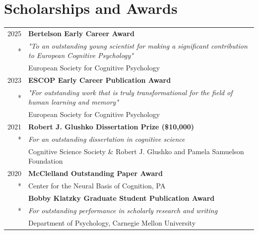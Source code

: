 \documentclass[letterpaper]{article}
\begin{document}
\section*{Scholarships and Awards}
\begin{longtable}{rl}
  2025        & \textbf{Bertelson Early Career Award}                                                                            \\*
  & {\it "To an outstanding young scientist for making a significant contribution to European Cognitive Psychology"} \\
              & European Society for Cognitive Psychology                                                                        \\[6pt]
              2023        & \textbf{ESCOP Early Career Publication Award}                                                                    \\*
              & {\it "For outstanding work that is truly transformational for the field of human learning and memory"}           \\
              & European Society for Cognitive Psychology                                                                        \\[6pt]
              2021        & \textbf{Robert J. Glushko Dissertation Prize (\$10,000)}                                                         \\*
              & {\it For an outstanding dissertation in cognitive science}                                                       \\
              & Cognitive Science Society \& Robert J. Glushko and Pamela Samuelson Foundation                                   \\[6pt]
              2020        & \textbf{McClelland Outstanding Paper Award}                                                                      \\*
              & Center for the Neural Basis of Cognition, PA                                                                     \\[6pt]
              & \textbf{Bobby Klatzky Graduate Student Publication Award}                                                        \\*
              & {\it For outstanding performance in scholarly research and writing}                                              \\
              & Department of Psychology, Carnegie Mellon University                                                             \\[6pt]

\end{longtable}
\end{document}

